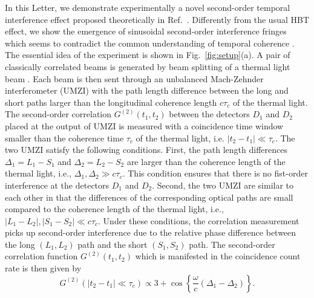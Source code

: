 \documentclass[aps,prl,reprint,showpacs,superscriptaddress]{revtex4-1}
\begin{document}
In this Letter, we demonstrate experimentally a novel second-order temporal interference effect proposed theoretically in Ref.~\cite{Tamma16a}. Differently from the usual HBT effect,  we  show the emergence of sinusoidal second-order interference fringes which seems to contradict the common understanding of temporal coherence \cite{Shih86,Hong87,Baek07,Kwon09,Ra13a}. The essential idea of the experiment is shown in Fig.~\ref{fig:setup}(a). A pair of classically correlated beams is generated by beam splitting of a thermal light beam \cite{Cho10a,Cho10b}. Each beam is then sent through an unbalanced Mach-Zehnder interferometer (UMZI) with the path length difference between the long and short paths larger than the longitudinal coherence length $c\tau_c$ of the thermal light. The second-order correlation $ G^{(2)}(t_{1},t_{2})$ between the detectors $D_1$ and $D_2$ placed at the output of  UMZI is measured with a coincidence time window smaller than the coherence time $\tau_c$  of the thermal light, i.e. $|t_2-t_1| \ll \tau_c$.  The two UMZI satisfy the following conditions. First, the path length differences $\Delta_1=L_1-S_1$ and $\Delta_2=L_2-S_2$ are larger than the coherence length of the thermal light, i.e., $\Delta_{1},  \Delta_{2} \gg c\tau_{c}$. This condition ensures that there is no fist-order interference at the detectors $D_1$ and $D_2$. Second, the two UMZI are similar to each other in that the differences of the corresponding optical paths are small compared to the coherence length of the thermal light, i.e., $|L_{1}-L_{2}|,  |S_{1}-S_{2}|  \ll  c\tau_{c}$. Under these conditions, the correlation measurement picks up second-order interference due to the relative phase difference between the long $(L_1,L_2)$ path and the short $(S_1,S_2)$ path.  The  second-order correlation function $G^{(2)}(t_{1},t_{2})$  which is manifested in the  coincidence count rate is then given by \cite{Tamma16a}
\begin{equation}
G^{(2)}(|t_2-t_1| \ll \tau_c) \propto 3+\cos\left\{\frac{\omega}{c} (\Delta_{1}-\Delta_{2})\right\}.
\end{equation}
\end{document}
